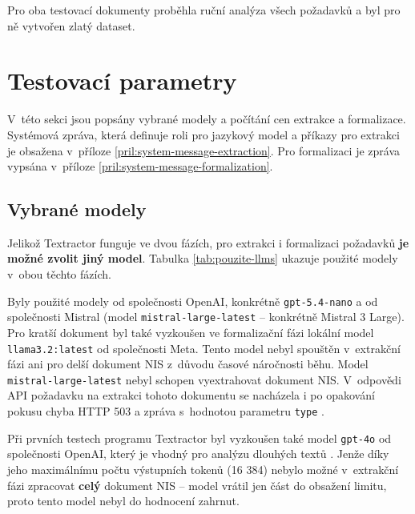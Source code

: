 \documentclass[czech, bc, kiv, he, iso690numb, pdf]{fasthesis}
\begin{document}
Pro oba testovací dokumenty proběhla ruční analýza všech požadavků a byl pro ně vytvořen zlatý dataset.

\section{Testovací parametry}
V~této sekci jsou popsány vybrané modely a počítání cen extrakce a formalizace. Systémová zpráva, která definuje roli pro jazykový model a příkazy pro extrakci je obsažena v~příloze \ref{pril:system-message-extraction}. Pro formalizaci je zpráva vypsána v~příloze \ref{pril:system-message-formalization}.

\subsection{Vybrané modely}\label{sec:vybrane-modely}
Jelikož Textractor funguje ve dvou fázích, pro extrakci i formalizaci požadavků \textbf{je možné zvolit jiný model}. Tabulka \ref{tab:pouzite-llms} ukazuje použité modely v~obou těchto fázích.

Byly použité modely od společnosti OpenAI, konkrétně \verb"gpt-5.4-nano" \cite{llm-gptnano} a od společnosti Mistral (model \verb"mistral-large-latest" \cite{llm-mistral} -- konkrétně Mistral 3 Large). Pro kratší dokument byl také vyzkoušen ve formalizační fázi lokální model \verb"llama3.2:latest" \cite{llm-llama} od společnosti Meta. Tento model nebyl spouštěn v~extrakční fázi ani pro delší dokument NIS z~důvodu časové náročnosti běhu. Model \verb"mistral-large-latest" nebyl schopen vyextrahovat dokument NIS. V~odpovědi API požadavku na extrakci tohoto dokumentu se nacházela i po opakování pokusu chyba HTTP 503 a zpráva  s~hodnotou parametru \verb"type" .

Při prvních testech programu Textractor byl vyzkoušen také model \verb"gpt-4o" \cite{llm-gpt4o} od společnosti OpenAI, který je vhodný pro analýzu dlouhých textů \cite{openai-platform-models}. Jenže díky jeho maximálnímu počtu výstupních tokenů (16 384) nebylo možné v~extrakční fázi zpracovat \textbf{celý} dokument NIS -- model vrátil jen část do obsažení limitu, proto tento model nebyl do hodnocení zahrnut.
\end{document}
